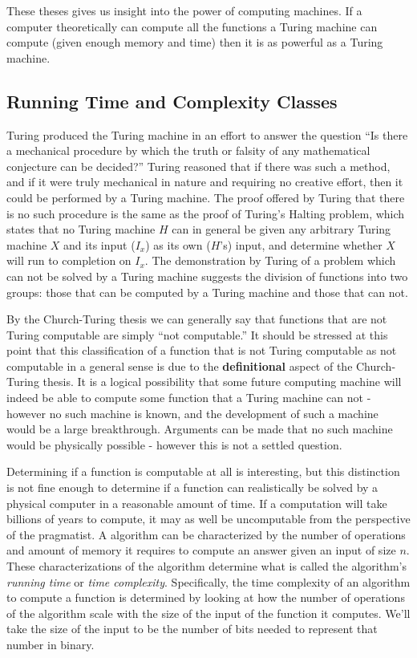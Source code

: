 \documentclass[]{article}
\begin{document}
These theses gives us insight into the power of computing machines.
If a computer theoretically can compute all the functions a Turing
machine can compute (given enough memory and time) then it is as
powerful as a Turing machine.

\subsection{Running Time and Complexity Classes}

Turing produced the Turing machine in an effort to answer the question
``Is there a mechanical procedure by which the truth or falsity of any
mathematical conjecture can be decided?''  Turing reasoned that if
there was such a method, and if it were truly mechanical in nature and
requiring no creative effort, then it could be performed by a Turing
machine.  The proof offered by Turing that there is no such procedure
is the same as the proof of Turing's Halting problem, which states
that no Turing machine $H$ can in general be given any arbitrary
Turing machine $X$ and its input ($I_x$) as its own ($H$'s) input, and
determine whether $X$ will run to completion on $I_x$.  The
demonstration by Turing of a problem which can not be solved by a
Turing machine suggests the division of functions into two groups:
those that can be computed by a Turing machine and those that can not.  

By the Church-Turing thesis we can generally say that functions that
are not Turing computable are simply ``not computable.'' It should be
stressed at this point that this classification of a function that is
not Turing computable as not computable in a general sense is due to
the \textbf{definitional} aspect of the Church-Turing thesis.  It is a
logical possibility that some future computing machine will indeed be
able to compute some function that a Turing machine can not - however
no such machine is known, and the development of such a machine would
be a large breakthrough.  Arguments can be made that no such machine
would be physically possible - however this is not a settled
question.

Determining if a function is computable at all is interesting, but this
distinction is not fine enough to determine if a function can
realistically be solved by a physical computer in a reasonable amount
of time.  If a computation will take billions of years to compute, it
may as well be uncomputable from the perspective of the pragmatist.  A
algorithm can be characterized by the number of operations and amount
of memory it requires to compute an answer given an input of size $n$.
These characterizations of the algorithm determine what is called the
algorithm's \emph{running time} or \emph{time complexity}.
Specifically, the time complexity of an algorithm to compute a
function is determined by looking at how the number of operations of
the algorithm scale with the size of the input of the function it
computes.  We'll take the size of the input to be the number of bits
needed to represent that number in binary.
\end{document}
